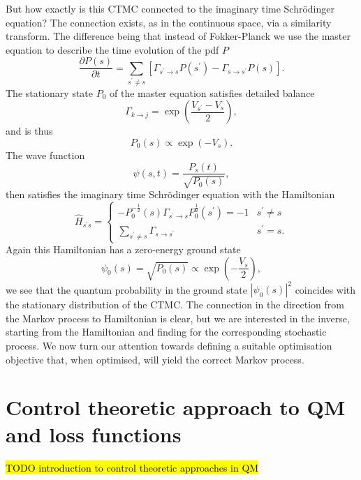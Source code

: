 But how exactly is this CTMC connected to the imaginary time Schr\" odinger equation? The connection exists, as in the continuous space, via a similarity transform. The difference being that instead of Fokker-Planck we use the master equation to describe the time evolution of the pdf $P$
\begin{equation}
\frac{\partial P(s)}{\partial t}=\sum_{s^\prime \neq s}\left[\Gamma_{s^\prime \rightarrow s} P(s^\prime)-\Gamma_{s \rightarrow s^\prime} P(s)\right].
\end{equation}
The stationary state $P_0$ of the master equation satisfies detailed balance
\begin{equation}
	\Gamma_{k \rightarrow j}=\exp \left(\frac{V_{s^\prime}-V_{s}}{2}\right),
\end{equation}
and is thus
\begin{equation}
	P_{0}(s) \propto \exp \left(-V_{s}\right).
\end{equation}
The wave function 
\begin{equation}
	\psi(s, t)=\frac{P_{s}(t)}{\sqrt{P_{0}(s)}},
\end{equation}
then satisfies the imaginary time Schr\" odinger equation with the Hamiltonian
\begin{equation}
	\hat H_{s^\prime s}=\left\{\begin{array}{ll}
	-P_{0}^{-\frac{1}{2}}(s) \Gamma_{s^\prime \rightarrow s} P_{0}^{\frac{1}{2}}(s^\prime)=-1 & s^\prime \neq s \\
	\sum_{s^\prime \neq s} \Gamma_{s \rightarrow s^\prime} & s^\prime=s.
	\end{array}\right. 
\end{equation}
Again this Hamiltonian has a zero-energy ground state 
\begin{equation}
	\psi_{0}(s)=\sqrt{P_{0}(s)} \propto \exp \left(-\frac{V_{s}}{2}\right),
\end{equation}
we see that the quantum probability in the ground state $|\psi_0(s)|^2$ coincides with the stationary distribution of the CTMC. The connection in the direction from the Markov process to Hamiltonian is clear, but we are interested in the inverse, starting from the Hamiltonian and finding for the corresponding stochastic process. We now turn our attention towards defining a suitable optimisation objective that, when optimised, will yield the correct Markov process.

\section{Control theoretic approach to QM and loss functions}
\hl{TODO introduction to control theoretic approaches in QM}

